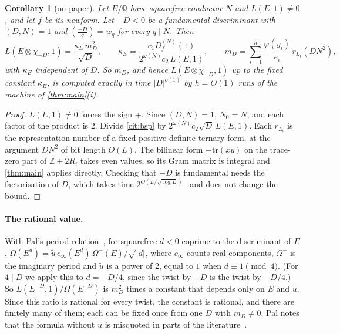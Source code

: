 \documentclass[10pt]{amsart}
\theoremstyle{plain}
\newtheorem{corollary}[theorem]{Corollary}
\theoremstyle{definition}
\theoremstyle{remark}
\numberwithin{equation}{section}
\newcommand{\Q}{\mathbb{Q}}
\newcommand{\nr}{\dag}%
\begin{document}
\begin{corollary}[on paper]\label{cor:twist}
Let $E/\Q$ have squarefree conductor $N$ and $L(E,1)\ne0$, and let $f$ be its newform. Let $-D<0$ be a
fundamental discriminant with $(D,N)=1$ and $(\frac{-D}{q})=w_q$ for every $q\mid N$. Then
\[
  L(E\otimes\chi_{-D},1)=\frac{\kappa_E\,m_D^2}{\sqrt D},\qquad
  \kappa_E=\frac{c_1D_f^{(N)}(1)}{2^{\omega(N)}c_2\,L(E,1)},\qquad
  m_D=\sum_{i=1}^h\frac{\varphi(y_i)}{e_i}\,r_{L_i}(DN^2),
\]
with $\kappa_E$ independent of $D$. So $m_D$, and hence $L(E\otimes\chi_{-D},1)$ up to the fixed constant
$\kappa_E$, is computed exactly in time $|D|^{o(1)}$ by $h=O(1)$ runs of the machine of \cref{thm:main}(i).
\end{corollary}

\begin{proof}
$L(E,1)\neq0$ forces the sign $+$. Since $(D,N)=1$, $N_0=N$, and each factor of the product is $2$. Divide
\cref{cit:bsp} by $2^{\omega(N)}c_2\sqrt D\,L(E,1)$. Each $r_{L_i}$ is the representation number of a fixed
positive-definite ternary form, at the argument $DN^2$ of bit length $O(L)$. The bilinear form $-\mathrm{tr}(xy)$
on the trace-zero part of $\mathbb{Z}+2R_i$ takes even values, so its Gram matrix is integral and
\cref{thm:main} applies directly. Checking that $-D$ is fundamental needs the factorisation of $D$, which takes
time $2^{O(L/\sqrt{\log L})}$~\cite{Shu26} and does not change the bound.
\end{proof}

\paragraph{The rational value.} With Pal's period relation~\cite[Main Result~1.1, Cor.~2.6]{Pal12}, for
squarefree $d<0$ coprime to the discriminant of $E$, $\Omega(E^d)=\tilde u\,c_\infty(E^d)\,\Omega^-(E)/\sqrt{|d|}$,
where $c_\infty$ counts real components, $\Omega^-$ is the imaginary period and $\tilde u$ is a power of $2$,
equal to $1$ when $d\equiv1\pmod4$. (For $4\mid D$ we apply this to $d=-D/4$, since the twist by $-D$ is the twist by $-D/4$.) So
$L(E^{-D},1)/\Omega(E^{-D})$ is $m_D^2$ times a constant that depends
only on $E$ and $\tilde u$. Since this ratio is rational for every twist\nr, the constant is rational, and
there are finitely many of them; each can be fixed once from one $D$ with $m_D\neq0$. Pal notes that the
formula without $\tilde u$ is misquoted in parts of the literature~\cite{Pal12}.
\end{document}
